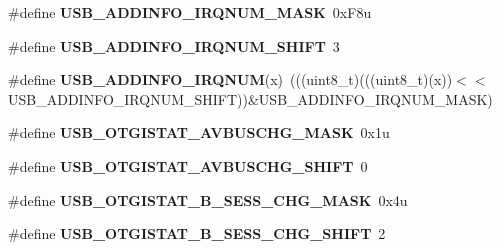 \begin{DoxyCompactItemize}
\item 
\#define {\bfseries U\+S\+B\+\_\+\+A\+D\+D\+I\+N\+F\+O\+\_\+\+I\+R\+Q\+N\+U\+M\+\_\+\+M\+A\+SK}~0x\+F8u\hypertarget{group__USB__Register__Masks_gaa578584bfaf89e26213e6ba12e5f4b0e}{}\label{group__USB__Register__Masks_gaa578584bfaf89e26213e6ba12e5f4b0e}

\item 
\#define {\bfseries U\+S\+B\+\_\+\+A\+D\+D\+I\+N\+F\+O\+\_\+\+I\+R\+Q\+N\+U\+M\+\_\+\+S\+H\+I\+FT}~3\hypertarget{group__USB__Register__Masks_ga3332243caa9e2f9cfc49b031ac54cbda}{}\label{group__USB__Register__Masks_ga3332243caa9e2f9cfc49b031ac54cbda}

\item 
\#define {\bfseries U\+S\+B\+\_\+\+A\+D\+D\+I\+N\+F\+O\+\_\+\+I\+R\+Q\+N\+UM}(x)~(((uint8\+\_\+t)(((uint8\+\_\+t)(x))$<$$<$U\+S\+B\+\_\+\+A\+D\+D\+I\+N\+F\+O\+\_\+\+I\+R\+Q\+N\+U\+M\+\_\+\+S\+H\+I\+FT))\&U\+S\+B\+\_\+\+A\+D\+D\+I\+N\+F\+O\+\_\+\+I\+R\+Q\+N\+U\+M\+\_\+\+M\+A\+SK)\hypertarget{group__USB__Register__Masks_ga0ab998135e9b4c5e89fa598b54bf96a3}{}\label{group__USB__Register__Masks_ga0ab998135e9b4c5e89fa598b54bf96a3}

\item 
\#define {\bfseries U\+S\+B\+\_\+\+O\+T\+G\+I\+S\+T\+A\+T\+\_\+\+A\+V\+B\+U\+S\+C\+H\+G\+\_\+\+M\+A\+SK}~0x1u\hypertarget{group__USB__Register__Masks_ga4aed6ee50bdd46063aa551dfb6e91d80}{}\label{group__USB__Register__Masks_ga4aed6ee50bdd46063aa551dfb6e91d80}

\item 
\#define {\bfseries U\+S\+B\+\_\+\+O\+T\+G\+I\+S\+T\+A\+T\+\_\+\+A\+V\+B\+U\+S\+C\+H\+G\+\_\+\+S\+H\+I\+FT}~0\hypertarget{group__USB__Register__Masks_ga0b762b08ffd3b747e2d0ad17b5f1641a}{}\label{group__USB__Register__Masks_ga0b762b08ffd3b747e2d0ad17b5f1641a}

\item 
\#define {\bfseries U\+S\+B\+\_\+\+O\+T\+G\+I\+S\+T\+A\+T\+\_\+\+B\+\_\+\+S\+E\+S\+S\+\_\+\+C\+H\+G\+\_\+\+M\+A\+SK}~0x4u\hypertarget{group__USB__Register__Masks_gafa204dddd4f034a5085b4599642689d7}{}\label{group__USB__Register__Masks_gafa204dddd4f034a5085b4599642689d7}

\item 
\#define {\bfseries U\+S\+B\+\_\+\+O\+T\+G\+I\+S\+T\+A\+T\+\_\+\+B\+\_\+\+S\+E\+S\+S\+\_\+\+C\+H\+G\+\_\+\+S\+H\+I\+FT}~2\hypertarget{group__USB__Register__Masks_gad18c5869e529e7edbe3251ee5e3ff33f}{}\label{group__USB__Register__Masks_gad18c5869e529e7edbe3251ee5e3ff33f}


\end{DoxyCompactItemize}

